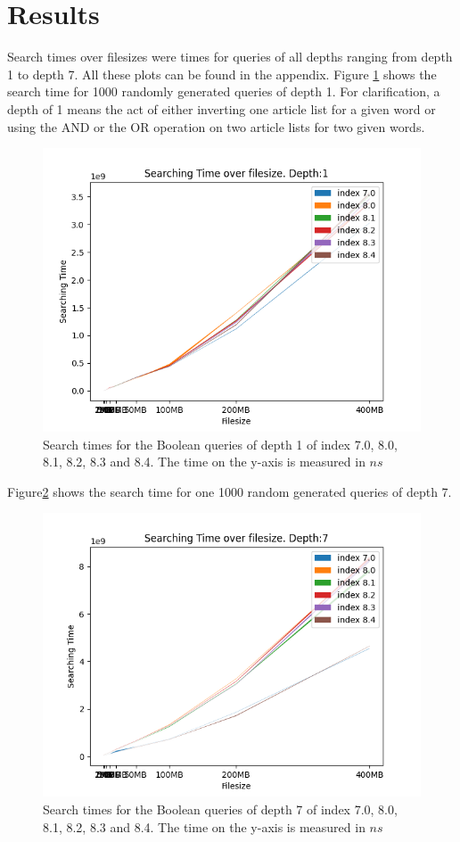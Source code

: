 \section{Results}
Search times over filesizes were times for queries of all depths ranging from depth 1 to depth 7. All these plots can be found in the appendix. Figure \ref{fig:Searchtimebool1} shows the search time for 1000 randomly generated queries of depth 1. For clarification, a depth of 1 means the act of either inverting one article list for a given word or using the AND or the OR operation on two article lists for two given words.

\begin{figure}[ht!]
    \centering
    \includegraphics[width=.8\textwidth]{LaTeX/Pictures/Results/BooleanSearchDepth0.png}
    \caption{Search times for the Boolean queries of depth 1 of index 7.0, 8.0, 8.1, 8.2, 8.3 and 8.4. The time on the y-axis is measured in $ns$}
    \label{fig:Searchtimebool1}
\end{figure}

Figure\ref{fig:Searchtimebool7} shows the search time for one 1000 random generated queries of depth 7.

\begin{figure}[ht!]
    \centering
    \includegraphics[width=.8\textwidth]{LaTeX/Pictures/Results/BooleanSearchDepth6.png}
    \caption{Search times for the Boolean queries of depth 7 of index 7.0, 8.0, 8.1, 8.2, 8.3 and 8.4. The time on the y-axis is measured in $ns$}
    \label{fig:Searchtimebool7}
\end{figure}

